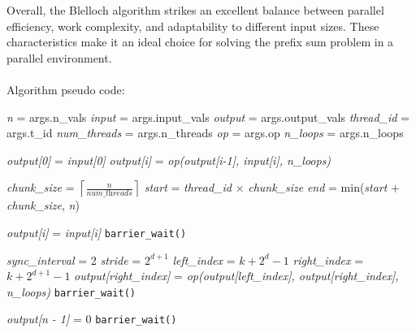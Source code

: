 \documentclass[letterpaper,12pt]{article}
\theoremstyle{remark}
\begin{document}
Overall, the Blelloch algorithm strikes an excellent balance between parallel efficiency, work complexity, and adaptability to different input sizes. These characteristics make it an ideal choice for solving the prefix sum problem in a parallel environment.\\\\
Algorithm pseudo code:
\begin{algorithmic}[1]
    \State \textit{n} = args.n\_vals
    \State \textit{input} = args.input\_vals
    \State \textit{output} = args.output\_vals
    \State \textit{thread\_id} = args.t\_id
    \State \textit{num\_threads} = args.n\_threads
    \State \textit{op} = args.op 
    \State \textit{n\_loops} = args.n\_loops
    
        \State \textit{output[0]} = \textit{input[0]}
            \State \textit{output[i]} = \textit{op(output[i-1], input[i], n\_loops)}
        \EndFor
        \State \Return
    \EndIf

    \State \textit{chunk\_size} = $\left\lceil \frac{n}{\textit{num\_threads}} \right\rceil$
    \State \textit{start} = \textit{thread\_id} $\times$ \textit{chunk\_size}
    \State \textit{end} = min(\textit{start} + \textit{chunk\_size}, \textit{n})
    
        \State \textit{output[i]} = \textit{input[i]}
    \EndFor
    \State \texttt{barrier\_wait()}

    \State \textit{sync\_interval} = 2
        \State \textit{stride} = $2^{d+1}$
            \State \textit{left\_index} = $k + 2^d - 1$
            \State \textit{right\_index} = $k + 2^{d+1} - 1$
                \State \textit{output[right\_index]} = \textit{op(output[left\_index], output[right\_index], n\_loops)}
            \EndIf
        \EndFor
            \State \texttt{barrier\_wait()}
        \EndIf
    \EndFor

        \State \textit{output[n - 1]} = 0 
    \EndIf
    \State \texttt{barrier\_wait()}


\end{algorithmic}
\end{document}
